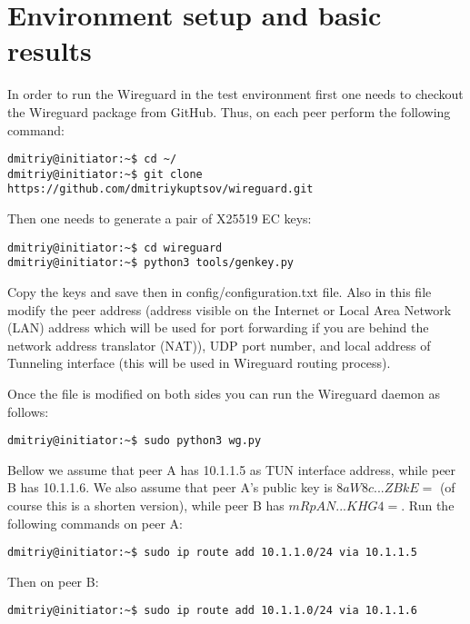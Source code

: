 \section{Environment setup and basic results}
\label{section:results}

In order to run the Wireguard in the test environment first one needs to
checkout the Wireguard package from GitHub. Thus, on each peer perform the 
following command:

\begin{verbatim}
dmitriy@initiator:~$ cd ~/
dmitriy@initiator:~$ git clone https://github.com/dmitriykuptsov/wireguard.git
\end{verbatim}

Then one needs to generate a pair of X25519 EC keys:

\begin{verbatim}
dmitriy@initiator:~$ cd wireguard
dmitriy@initiator:~$ python3 tools/genkey.py
\end{verbatim}

Copy the keys and save then in config/configuration.txt file. Also in this file modify the 
peer address (address visible on the Internet or Local Area Network (LAN) address which will be used for 
port forwarding if you are behind the network address translator (NAT)), UDP port number, and local
address of Tunneling interface (this will be used in Wireguard routing process). 

Once the file is modified on both sides you can run the Wireguard daemon as follows:

\begin{verbatim}
dmitriy@initiator:~$ sudo python3 wg.py
\end{verbatim}

Bellow we assume that peer A has 10.1.1.5 as TUN interface address, while peer B has 10.1.1.6.
We also assume that peer A's public key is $8aW8c...ZBkE=$ (of course this is a shorten version), 
while peer B has $mRpAN...KHG4=$. Run the following commands on peer A:

\begin{verbatim}
dmitriy@initiator:~$ sudo ip route add 10.1.1.0/24 via 10.1.1.5
\end{verbatim}

Then on peer B:

\begin{verbatim}
dmitriy@initiator:~$ sudo ip route add 10.1.1.0/24 via 10.1.1.6
\end{verbatim}

